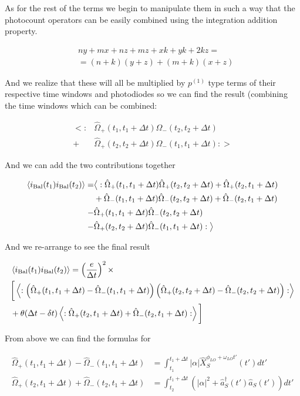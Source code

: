 \documentclass[12pt]{article}
\begin{document}
As for the rest of the terms we begin to manipulate them in such a way that the photocount operators can be easily combined using the integration addition property.

\begin{align}
&ny + mx + nz + mz + xk + yk + 2kz=\\
&= (n+k)(y+z) + (m+k)(x+z)
\end{align}

And we realize that these will all be multiplied by $p^{(1)}$ type terms of their respective time windows and photodiodes so we can find the result (combining the time windows which can be combined:

\begin{align}
\big<:&\hat{\Omega}_+(t_1,t_1+\Delta t) \hat{\Omega}_-(t_2,t_2+\Delta t)\\
+&\hat{\Omega}_+(t_2,t_2+\Delta t) \hat{\Omega}_-(t_1,t_1+\Delta t):\big>
\end{align}

And we can add the two contributions together

\begin{align}
\braket{i_{\text{Bal}}(t_1)i_{\text{Bal}}(t_2)} = &\big<: \hat{\Omega}_+(t_1,t_1+\Delta t)\hat{\Omega}_+(t_2,t_2+\Delta t) + \hat{\Omega}_+(t_2,t_1+\Delta t)\\
&+ \hat{\Omega}_-(t_1,t_1+\Delta t)\hat{\Omega}_-(t_2,t_2+\Delta t) + \hat{\Omega}_-(t_2,t_1+\Delta t)\\
-&\hat{\Omega}_+(t_1,t_1+\Delta t) \hat{\Omega}_-(t_2,t_2+\Delta t)\\
-&\hat{\Omega}_+(t_2,t_2+\Delta t) \hat{\Omega}_-(t_1,t_1+\Delta t)
:\big>
\end{align}

And we re-arrange to see the final result

\begin{align}
&\braket{i_{\text{Bal}}(t_1)i_{\text{Bal}}(t_2)} = \left(\frac{e}{\Delta t}\right)^2 \times\\
&\bigg[ \left<: \left(\hat{\Omega}_+(t_1,t_1+\Delta t) - \hat{\Omega}_-(t_1,t_1+\Delta t)\right)\left(\hat{\Omega}_+(t_2,t_2+\Delta t) - \hat{\Omega}_-(t_2,t_2+\Delta t)\right) : \right>\\
&+ \theta(\Delta t - \delta t)\left<:\hat{\Omega}_+( t_2,t_1+\Delta t)+\hat{\Omega}_-( t_2,t_1+ \Delta t):\right>\bigg]
\end{align}

From above we can find the formulas for 

\begin{align}
\hat{\Omega}_+(t_1,t_1+\Delta t) - \hat{\Omega}_-(t_1,t_1+\Delta t) &= \int_{t_1}^{t_1+\Delta t} |\alpha| \hat{X}_S^{\phi_{LO}+\omega_{LO}t'}(t') dt'\\
\hat{\Omega}_+(t_2,t_1+\Delta t) + \hat{\Omega}_-(t_2,t_1+\Delta t) &= \int_{t_2}^{t_1+\Delta t} \left(|\alpha|^2 + \hat{a}^{\dag}_{S}(t')\hat{a}_{S}(t') \right) dt'
\end{align}
\end{document}

